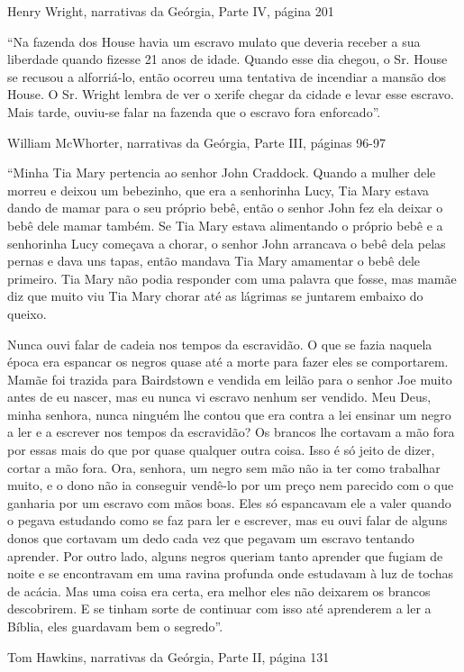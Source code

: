 Henry Wright, narrativas da Geórgia, Parte IV, página 201

``Na fazenda dos House havia um escravo mulato que deveria receber a sua
liberdade quando fizesse 21 anos de idade. Quando esse dia chegou, o Sr.
House se recusou a alforriá-lo, então ocorreu uma tentativa de incendiar
a mansão dos House. O Sr. Wright lembra de ver o xerife chegar da cidade
e levar esse escravo. Mais tarde, ouviu-se falar na fazenda que o
escravo fora enforcado''.

William McWhorter, narrativas da Geórgia, Parte III, páginas 96-97

``Minha Tia Mary pertencia ao senhor John Craddock. Quando a mulher dele
morreu e deixou um bebezinho, que era a senhorinha Lucy, Tia Mary estava
dando de mamar para o seu próprio bebê, então o senhor John fez ela
deixar o bebê dele mamar também. Se Tia Mary estava alimentando o
próprio bebê e a senhorinha Lucy começava a chorar, o senhor John
arrancava o bebê dela pelas pernas e dava uns tapas, então mandava Tia
Mary amamentar o bebê dele primeiro. Tia Mary não podia responder com
uma palavra que fosse, mas mamãe diz que muito viu Tia Mary chorar até
as lágrimas se juntarem embaixo do queixo.

Nunca ouvi falar de cadeia nos tempos da escravidão. O que se fazia
naquela época era espancar os negros quase até a morte para fazer eles
se comportarem. Mamãe foi trazida para Bairdstown e vendida em leilão
para o senhor Joe muito antes de eu nascer, mas eu nunca vi escravo
nenhum ser vendido. Meu Deus, minha senhora, nunca ninguém lhe contou
que era contra a lei ensinar um negro a ler e a escrever nos tempos da
escravidão? Os brancos lhe cortavam a mão fora por essas mais do que por
quase qualquer outra coisa. Isso é só jeito de dizer, cortar a mão fora.
Ora, senhora, um negro sem mão não ia ter como trabalhar muito, e o dono
não ia conseguir vendê-lo por um preço nem parecido com o que ganharia
por um escravo com mãos boas. Eles só espancavam ele a valer quando o
pegava estudando como se faz para ler e escrever, mas eu ouvi falar de
alguns donos que cortavam um dedo cada vez que pegavam um escravo
tentando aprender. Por outro lado, alguns negros queriam tanto aprender
que fugiam de noite e se encontravam em uma ravina profunda onde
estudavam à luz de tochas de acácia. Mas uma coisa era certa, era melhor
eles não deixarem os brancos descobrirem. E se tinham sorte de continuar
com isso até aprenderem a ler a Bíblia, eles guardavam bem o segredo''.

Tom Hawkins, narrativas da Geórgia, Parte II, página 131

